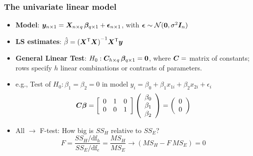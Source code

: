 \renewcommand{\FileName}{mlm}
\begin{frame}
  \frametitle{The univariate linear model}
  \begin{itemize}
	\item {\bfseries Model}: 
	$\bm{y}_{n \times 1} = \bm{X}_{n \times q} \,\bm{\beta}_{q \times 1} + \bm{\epsilon}_{n \times 1}$,
	with $\bm{\epsilon} \sim \mathcal{N} ( \bm{0}, \sigma^2 \bm{I}_n )$
	\item {\bfseries LS estimates}:
	$\hat{\beta} = {(\bm{X}^\mathsf{T} \bm{X})}^{-1} \bm{X}^\mathsf{T} \bm{y}$
	\item {\bfseries General Linear Test}: $H_0 : \bm{C}_{h \times q} \,
	 \bm{\beta}_{q \times 1} = \bm{0}$,
	  where $\bm{C}= $ matrix of constants; rows specify $h$ linear combinations or contrasts of parameters.
	  \item e.g., Test of $H_0 : \beta_1 = \beta_2 = 0$ in model $y_i = \beta_0 + \beta_1 x_{1i} + \beta_2 x_{2i} + \epsilon_i$
	\begin{equation*}
	\bm{C} \bm{\beta} = \left[
	\begin{array}{rrr}
    0  &  1  &  0 \\
	0  &  0  &  1
	\end{array}\right]
	\left(
	\begin{array}{l}
	\beta_0 \\ \beta_1 \\ \beta_2
	\end{array}
	\right)
	=
	\left(
	\begin{array}{l}
	0 \\ 0
	\end{array}
	\right)
	\end{equation*}
	  \item All $\rightarrow$ F-test:  How big is $SS_H$ relative to $SS_E$?
	\begin{equation*}
F = \frac{SS_H / \textrm{df}_h}{SS_E / \textrm{df}_e} = \frac{MS_H}{MS_E} \longrightarrow
  ( MS_H - F \: MS_E ) = 0
	\end{equation*}
  \end{itemize}
\end{frame}


